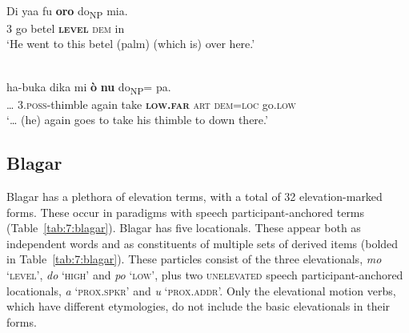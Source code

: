 \ea%
\label{ex:7:11}
 \\
\gll Di  yaa  {\ob}fu \textbf{oro} do{\cb}\textsubscript{NP} mia. \\
  \textsc{3} go   betel  \textbf{\textsc{level}} \textsc{dem} in  \\
\glt   `He went to this betel (palm) (which is) over here.'  
\z

  

 



 

\ea%
\label{ex:7:12}
 \\
\gll {\dots} ha-buka{\ng} dika{\ng} mi     {\ob}\textbf{ò} \textbf{nu}    do{\cb}\textsubscript{NP}={\ng}    pa. \\
  {\dots} 3.\textsc{poss}{}-thimble  again  take  \textbf{\textsc{low.far}} \textsc{art}  \textsc{dem=loc} go.\textsc{low}  \\
\glt `{\dots} (he) again goes to take his thimble to down there.' 
\z

 

   

  

\subsection{Blagar}
Blagar has a plethora of elevation terms, with a total of 32 elevation-marked forms. These occur in paradigms with speech participant-anchored terms (Table~\ref{tab:7:blagar}). Blagar has five locationals. These appear both as independent words and as constituents of multiple sets of derived items (bolded in Table~\ref{tab:7:blagar}). These particles consist of the three elevationals, \textit{mo} `\textsc{level',} \textit{do} `\textsc{high'} and \textit{po} `\textsc{low',} plus two \textsc{unelevated} speech participant-anchored locationals, \textit{{\textglotstop}}\textit{a} `\textsc{prox.spkr'} and \textit{{\textglotstop}}\textit{u} `\textsc{prox.addr'.} Only the elevational motion verbs, which have different etymologies, do not include the basic elevationals  in their forms.



